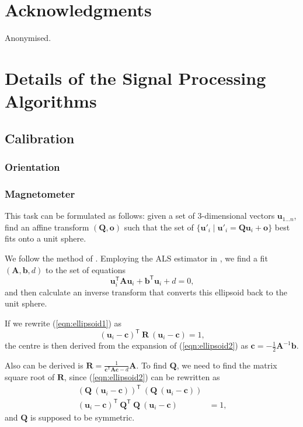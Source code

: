 \documentclass{nime-alternate} %
\begin{document}
\section{Acknowledgments}
Anonymised.


 

\appendix
\section{Details of the Signal Processing Algorithms}
\label{appendix:signal-processing}

\subsection{Calibration}
\subsubsection{Orientation}
\subsubsection{Magnetometer}
This task can be formulated as follows: given a set of 3-dimensional vectors $\mathbf{u}_{1 \dots n}$, find an affine transform $(\mathbf{Q}, \mathbf{o})$ such that the set of $\{\mathbf{u}'_i \mathbin{\mathop{|}} \mathbf{u}'_i = \mathbf{Q} \mathbf{u}_i + \mathbf{o}\}$ best fits onto a unit sphere.

We follow the method of \cite{Renaudin2010}. Employing the ALS estimator in \cite{Markovsky_2004_ALS}, we find a fit $(\mathbf{A}, \mathbf{b}, d)$ to the set of equations
\begin{equation}\label{eqn:ellipsoid1}
\mathbf{u}_i^\mathsf{T} \mathbf{A} \mathbf{u}_i + \mathbf{b}^\mathsf{T} \mathbf{u}_i + d = 0\text{,}
\end{equation}
and then calculate an inverse transform that converts this ellipsoid back to the unit sphere.

If we rewrite (\ref{eqn:ellipsoid1}) as
\begin{equation}\label{eqn:ellipsoid2}
(\mathbf{u}_i - \mathbf{c})^\mathsf{T} \ \mathbf{R} \ (\mathbf{u}_i - \mathbf{c}) = 1\text{,}
\end{equation}
the centre is then derived from the expansion of (\ref{eqn:ellipsoid2}) as $\mathbf{c} = -\frac 1 2 \mathbf{A}^{-1} \mathbf{b}$.

Also can be derived is $\mathbf{R} = \frac {1}{\mathbf{c}^\mathsf{T} \mathbf{A} \mathbf{c} - d} \mathbf{A}$. To find $\mathbf{Q}$, we need to find the matrix square root of $\mathbf{R}$, since (\ref{eqn:ellipsoid2}) can be rewritten as
\begin{equation}\label{eqn:ellipsoid3}
\begin{aligned}
(\mathbf{Q} \ (\mathbf{u}_i - \mathbf{c}))^\mathsf{T} \ (\mathbf{Q} \ (\mathbf{u}_i - \mathbf{c})) & \\
(\mathbf{u}_i - \mathbf{c})^\mathsf{T} \ \mathbf{Q}^\mathsf{T} \ \mathbf{Q} \ (\mathbf{u}_i - \mathbf{c}) &= 1\text{,}
\end{aligned}
\end{equation}
and $\mathbf{Q}$ is supposed to be symmetric.
\end{document}
